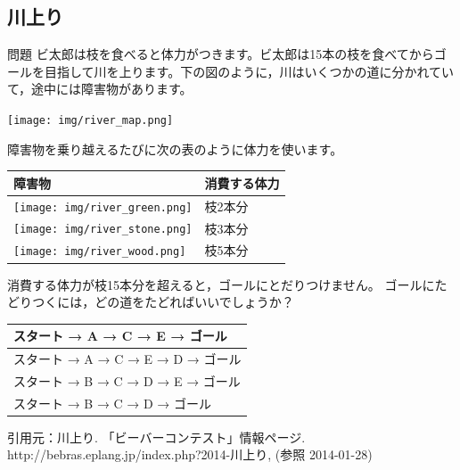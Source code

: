 \documentclass[a4paper]{jarticle}
\begin{document}
\begin{multicols}{2}
\subsection{川上り}
\begin{itembox}[l]{問題}
ビ太郎は枝を食べると体力がつきます。ビ太郎は15本の枝を食べてからゴールを目指して川を上ります。下の図のように，川はいくつかの道に分かれていて，途中には障害物があります。
\begin{center}
\texttt{[image: img/river\_map.png]}
\end{center}
障害物を乗り越えるたびに次の表のように体力を使います。\\
\begin{center}
\begin{tabular}{|p{1cm}|p{2cm}|} \hline
障害物 & 消費する体力\\ \hline
\texttt{[image: img/river\_green.png]} & 枝2本分\\ \hline
\texttt{[image: img/river\_stone.png]} & 枝3本分\\ \hline
\texttt{[image: img/river\_wood.png]} & 枝5本分\\[0.5cm] \hline
\end{tabular}
\end{center}
消費する体力が枝15本分を超えると，ゴールにとだりつけません。
ゴールにたどりつくには，どの道をたどればいいでしょうか？
\begin{center}
\begin{tabular}{|p{7cm}|} \hline
スタート → A → C → E → ゴール\\ \hline
スタート → A → C → E → D → ゴール\\ \hline
スタート → B → C → D → E → ゴール\\ \hline
スタート → B → C → D → ゴール\\ \hline
\end{tabular}
\end{center}
{ \scriptsize 引用元：川上り. 「ビーバーコンテスト」情報ページ. http://bebras.eplang.jp/index.php?2014-川上り, (参照 2014-01-28)}
\end{itembox}


\end{multicols}
\end{document}
